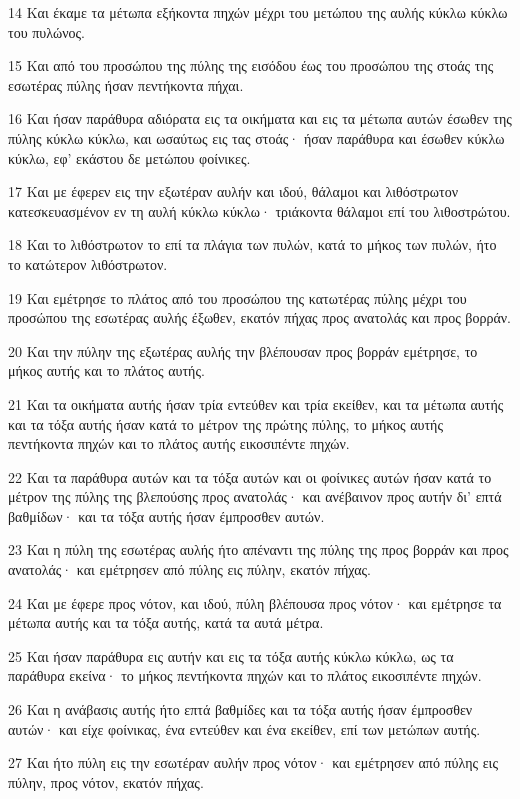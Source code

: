 \par 14 Και έκαμε τα μέτωπα εξήκοντα πηχών μέχρι του μετώπου της αυλής κύκλω κύκλω του πυλώνος.
\par 15 Και από του προσώπου της πύλης της εισόδου έως του προσώπου της στοάς της εσωτέρας πύλης ήσαν πεντήκοντα πήχαι.
\par 16 Και ήσαν παράθυρα αδιόρατα εις τα οικήματα και εις τα μέτωπα αυτών έσωθεν της πύλης κύκλω κύκλω, και ωσαύτως εις τας στοάς· ήσαν παράθυρα και έσωθεν κύκλω κύκλω, εφ' εκάστου δε μετώπου φοίνικες.
\par 17 Και με έφερεν εις την εξωτέραν αυλήν και ιδού, θάλαμοι και λιθόστρωτον κατεσκευασμένον εν τη αυλή κύκλω κύκλω· τριάκοντα θάλαμοι επί του λιθοστρώτου.
\par 18 Και το λιθόστρωτον το επί τα πλάγια των πυλών, κατά το μήκος των πυλών, ήτο το κατώτερον λιθόστρωτον.
\par 19 Και εμέτρησε το πλάτος από του προσώπου της κατωτέρας πύλης μέχρι του προσώπου της εσωτέρας αυλής έξωθεν, εκατόν πήχας προς ανατολάς και προς βορράν.
\par 20 Και την πύλην της εξωτέρας αυλής την βλέπουσαν προς βορράν εμέτρησε, το μήκος αυτής και το πλάτος αυτής.
\par 21 Και τα οικήματα αυτής ήσαν τρία εντεύθεν και τρία εκείθεν, και τα μέτωπα αυτής και τα τόξα αυτής ήσαν κατά το μέτρον της πρώτης πύλης, το μήκος αυτής πεντήκοντα πηχών και το πλάτος αυτής εικοσιπέντε πηχών.
\par 22 Και τα παράθυρα αυτών και τα τόξα αυτών και οι φοίνικες αυτών ήσαν κατά το μέτρον της πύλης της βλεπούσης προς ανατολάς· και ανέβαινον προς αυτήν δι' επτά βαθμίδων· και τα τόξα αυτής ήσαν έμπροσθεν αυτών.
\par 23 Και η πύλη της εσωτέρας αυλής ήτο απέναντι της πύλης της προς βορράν και προς ανατολάς· και εμέτρησεν από πύλης εις πύλην, εκατόν πήχας.
\par 24 Και με έφερε προς νότον, και ιδού, πύλη βλέπουσα προς νότον· και εμέτρησε τα μέτωπα αυτής και τα τόξα αυτής, κατά τα αυτά μέτρα.
\par 25 Και ήσαν παράθυρα εις αυτήν και εις τα τόξα αυτής κύκλω κύκλω, ως τα παράθυρα εκείνα· το μήκος πεντήκοντα πηχών και το πλάτος εικοσιπέντε πηχών.
\par 26 Και η ανάβασις αυτής ήτο επτά βαθμίδες και τα τόξα αυτής ήσαν έμπροσθεν αυτών· και είχε φοίνικας, ένα εντεύθεν και ένα εκείθεν, επί των μετώπων αυτής.
\par 27 Και ήτο πύλη εις την εσωτέραν αυλήν προς νότον· και εμέτρησεν από πύλης εις πύλην, προς νότον, εκατόν πήχας.
